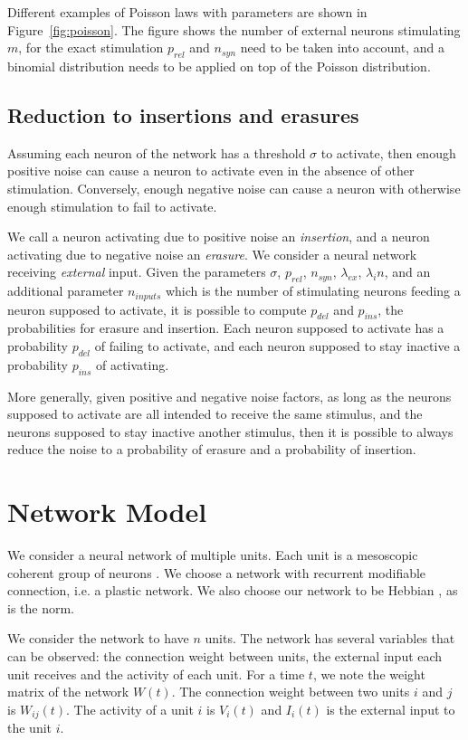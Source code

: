 \documentclass[journal]{IEEEtran}
\begin{document}
Different examples of Poisson laws with parameters are shown in Figure~\ref{fig:poisson}. The figure shows the number of external neurons stimulating $m$, for the exact stimulation $p_{rel}$ and $n_{syn}$ need to be taken into account, and a binomial distribution needs to be applied on top of the Poisson distribution.

\subsection{Reduction to insertions and erasures}

Assuming each neuron of the network has a threshold $\sigma$ to activate, then enough positive noise can cause a neuron to activate even in the absence of other stimulation. Conversely, enough negative noise can cause a neuron with otherwise enough stimulation to fail to activate.

We call a neuron activating due to positive noise an \emph{insertion}, and a neuron activating due to negative noise an \emph{erasure}. We consider a neural network receiving \emph{external} input. Given the parameters $\sigma$, $p_{rel}$, $n_{syn}$, $\lambda_{ex}$, $\lambda_in$, and an additional parameter $n_{inputs}$ which is the number of stimulating neurons feeding a neuron supposed to activate, it is possible to compute $p_{del}$ and $p_{ins}$, the probabilities for erasure and insertion. Each neuron supposed to activate has a probability $p_{del}$ of failing to activate, and each neuron supposed to stay inactive a probability $p_{ins}$ of activating.

More generally, given positive and negative noise factors, as long as the neurons supposed to activate are all intended to receive the same stimulus, and the neurons supposed to stay inactive another stimulus, then it is possible to always reduce the noise to a probability of erasure and a probability of insertion.

\section{Network Model}

We consider a neural network of multiple units. Each unit is a mesoscopic coherent group of neurons \cite{galtier2012hebbian}. We choose a network with recurrent modifiable connection, i.e. a plastic network. We also choose our network to be Hebbian \cite{hagan1996neural}, as is the norm.

We consider the network to have $n$ units. The network has several variables that can be observed: the connection weight between units, the external input each unit receives and the activity of each unit. For a time $t$, we note the weight matrix of the network $W(t)$. The connection weight between two units $i$ and $j$  is $W_{ij}(t)$. The activity of a unit $i$ is $V_i(t)$ and $I_i(t)$ is the external input to the unit $i$. 
\end{document}
